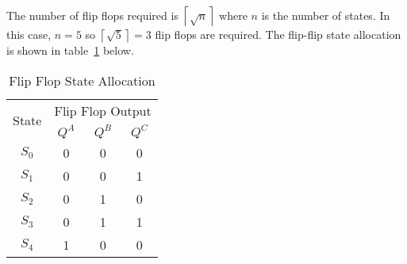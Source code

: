 The number of flip flops required is $\left \lceil{\sqrt{n}}\right \rceil $ where $n$ is the number of states. In this case, $n=5$ so $\left \lceil{\sqrt{5}}\right \rceil =3$ flip flops are required. The flip-flip state allocation is shown in table~\ref{tab:Q14} below.


\begin{table}[ht!]
    \centering
    \begin{tabular}{|c||ccc|}
        \hline
        \multirow{2}{*}{State} & \multicolumn{3}{c|}{Flip Flop Output}                           \\ \cline{2-4} 
                               & \multicolumn{1}{c|}{$Q^A$} & \multicolumn{1}{c|}{$Q^B$} & $Q^C$ \\ \hhline{|=||=|=|=|} 
        $S_0$                  & \multicolumn{1}{c|}{0}     & \multicolumn{1}{c|}{0}     & 0     \\ \hline
        $S_1$                  & \multicolumn{1}{c|}{0}     & \multicolumn{1}{c|}{0}     & 1     \\ \hline
        $S_2$                  & \multicolumn{1}{c|}{0}     & \multicolumn{1}{c|}{1}     & 0     \\ \hline
        $S_3$                  & \multicolumn{1}{c|}{0}     & \multicolumn{1}{c|}{1}     & 1     \\ \hline
        $S_4$                  & \multicolumn{1}{c|}{1}     & \multicolumn{1}{c|}{0}     & 0     \\ \hline
        \end{tabular}
    \caption{Flip Flop State Allocation}\label{tab:Q14}
    \end{table}